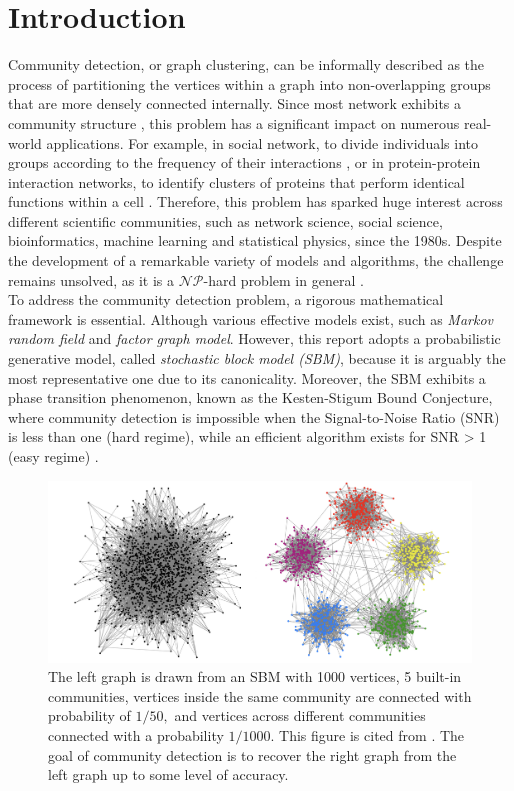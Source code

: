\chapter{Introduction}
Community detection, or graph clustering,  can be informally described as the process of partitioning the vertices within a graph into non-overlapping groups that are more densely connected internally. Since most network exhibits a community structure \cite{comm_dete_in_graphs}, this problem has a significant impact on numerous real-world applications. For example, in social network, to divide individuals into groups according to the frequency of their interactions \cite{social}, or in protein-protein interaction networks, to identify clusters of proteins that perform identical functions within a cell \cite{bio}. Therefore, this problem has sparked huge interest across different scientific communities, such as network science, social science, bioinformatics, machine learning and statistical physics, since the 1980s. Despite the development of a remarkable variety of models and algorithms, the challenge remains unsolved, as it is a $\mathcal{NP}$-hard problem in general \cite{np-hard}.\\

To address the community detection problem, a rigorous mathematical framework is essential. Although various effective models exist, such as \textit{Markov random field} and \textit{factor graph model}. However, this report adopts a probabilistic generative model, called \textit{stochastic block model (SBM)}, because it is arguably the most representative one due to its canonicality. Moreover, the SBM exhibits a phase transition phenomenon, known as the Kesten-Stigum Bound Conjecture, where community detection is impossible when the Signal-to-Noise Ratio (SNR) is less than one (hard regime), while an efficient algorithm exists for SNR > 1 (easy regime) \cite{Emmanuel2023} \cite{deeplearning}.\\

\begin{figure}[h]
    \centering
    \includegraphics[width=1\linewidth]{Figures/community.jpg}
    \caption[Community Structure]{The left graph is drawn from an SBM with 1000 vertices, 5 built-in communities, vertices inside the same community are connected with probability of $1/50,$ and vertices across different communities connected with a probability $1/1000.$ This figure is cited from \cite{TheConjecture}. The goal of community detection is to recover the right graph from the left graph up to some level of accuracy.}
    \label{fig:community}
\end{figure}

